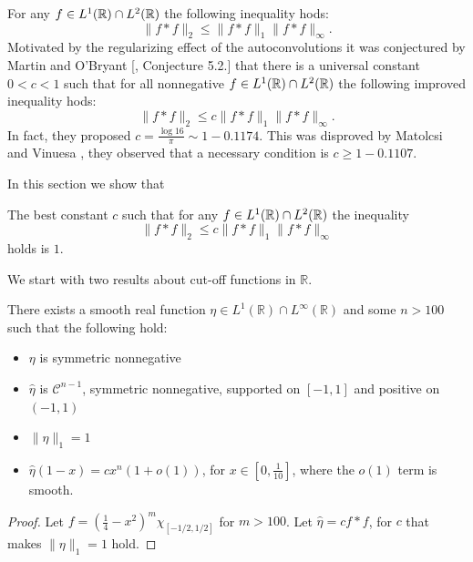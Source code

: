 
For any $f\in L^{1}({\mathbb R})\cap L^2({\mathbb R})$ the following inequality hods: 
\begin{equation*}
     \|f\ast f\|_{2} \le 
     \|f\ast f\|_{1}
     \|f\ast f\|_{\infty}.
\end{equation*}
Motivated by the regularizing effect of the autoconvolutions it was conjectured by Martin and O’Bryant [\cite{MOB3}, Conjecture 5.2.] that there is a
universal constant $0<c<1$ such that for all nonnegative $f\in L^{1}({\mathbb R})\cap L^2({\mathbb R})$ the following improved inequality hods: 
\begin{equation*}\label{ineq thm 2}
     \|f\ast f\|_{2} \le c
     \|f\ast f\|_{1}
     \|f\ast f\|_{\infty}.
\end{equation*}
In fact, they proposed $c=\frac{\log 16}{\pi}\sim 1-0.1174$. This was disproved by Matolcsi and Vinuesa \cite{MV}, they observed that a necessary condition is $c\geq 1-0.1107$.

In this section we show that 

\begin{theorem}\label{otro teorema de autoconvolutions}
The best constant $c$ such that for any $f\in L^{1}({\mathbb R})\cap L^2({\mathbb R})$ the inequality 
\begin{equation}
    \|f\ast f\|_{2} \le c
     \|f\ast f\|_{1}
     \|f\ast f\|_{\infty}
\end{equation}
holds is $1$.
\end{theorem}

We start with two results about cut-off functions in $\mathbb R$.

\begin{prop}
There exists a smooth real function $\eta \in L^1(\mathbb R) \cap L^\infty(\mathbb R)$ and some $n>100$ such that the following hold:

\begin{itemize}
	\item $\eta$ is symmetric nonnegative
	\item $\hat \eta$ is $\mathcal C^{n-1}$, symmetric nonnegative, supported on $[-1,1]$ and positive on $(-1,1)$
	\item $\|\eta\|_1=1$
	\item $\hat\eta(1-x) = c x^n(1+o(1))$, for $x \in [0,\frac 1 {10}]$, where the $o(1)$ term is smooth.
\end{itemize}
\end{prop}

\begin{proof}
	Let $f = (\frac 1 4-x^2)^m \chi_{[-1/2,1/2]}$ for $m>100$. Let $\hat \eta = c f\ast f$, for $c$ that makes  $\|\eta\|_1=1$ hold.
\end{proof}

